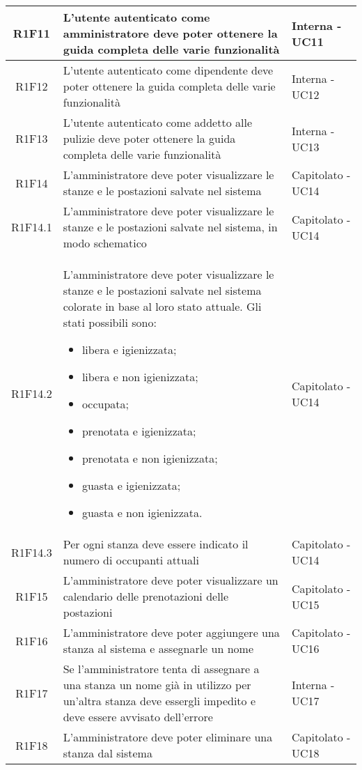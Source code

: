 \begin{center}
\begin{longtable}{|c|p{10cm}|p{4cm}|}
		\hline
		R1F11	&	L'utente autenticato come amministratore deve poter ottenere la guida completa delle varie funzionalità& Interna - UC11	\\
		\hline
		R1F12	&	L'utente autenticato come dipendente deve poter ottenere la guida completa delle varie funzionalità& Interna - UC12	\\
		\hline
		R1F13	&	L'utente autenticato come addetto alle pulizie deve poter ottenere la guida completa delle varie funzionalità& Interna - UC13	\\
		\hline
		R1F14&L'amministratore deve poter visualizzare le stanze e le postazioni salvate nel sistema& Capitolato - UC14	\\
		\hline
		R1F14.1&L'amministratore deve poter visualizzare le stanze e le postazioni salvate nel sistema, in modo schematico& Capitolato - UC14	\\
		\hline
		R1F14.2&L'amministratore deve poter visualizzare le stanze e le postazioni salvate nel sistema colorate in base al loro stato attuale. Gli stati possibili sono:
		\begin{itemize}
			\item libera e igienizzata;
			\item libera e non igienizzata;
			\item occupata;
			\item prenotata e igienizzata;
			\item prenotata e non igienizzata;
			\item guasta e igienizzata;
			\item guasta e non igienizzata.
		\end{itemize}& Capitolato - UC14	\\
		\hline
		R1F14.3&Per ogni stanza deve essere indicato il numero di occupanti attuali	& Capitolato - UC14	\\
		\hline
		R1F15&L'amministratore deve poter visualizzare un calendario delle prenotazioni delle postazioni	& Capitolato - UC15	\\
		\hline
		R1F16&L'amministratore deve poter aggiungere una stanza al sistema e assegnarle un nome	& Capitolato - UC16	\\
		\hline
		R1F17 & Se l'amministratore tenta di assegnare a una stanza un nome già in utilizzo per un'altra stanza deve essergli impedito e deve essere avvisato dell'errore & Interna - UC17 \\
		\hline
		R1F18&L'amministratore deve poter eliminare una stanza dal sistema	& Capitolato - UC18	\\

\end{longtable}
\end{center}
